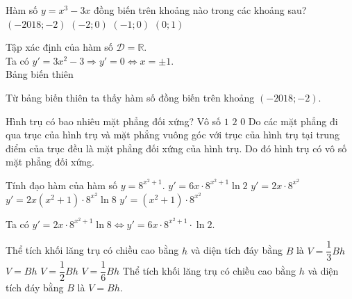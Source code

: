 \begin{ex}%
	Hàm số $y=x^3-3x$ đồng biến trên khoảng nào trong các khoảng sau?
	\choice
	{\True $(-2018;-2)$}
	{$(-2;0)$}
	{$(-1;0)$}
	{$(0;1)$}
	\loigiai
	{ Tập xác định của hàm số $ \mathscr{D} =\mathbb{R}.$\\
		Ta có $y'=3x^2-3 \Rightarrow y'=0 \Leftrightarrow x= \pm 1$.\\
		Bảng biến thiên
		\begin{center}
		\end{center}
	Từ bảng biến thiên ta thấy hàm số đồng biến trên khoảng $(-2018;-2)$.
	}
\end{ex}

\begin{ex}%
	Hình trụ có bao nhiêu mặt phẳng đối xứng?
	\choice
	{\True Vô số}
	{$1$}
	{$2$}
	{$0$}
	\loigiai
	{ Do các mặt phẳng đi qua trục của hình trụ và mặt phẳng vuông góc với trục của hình trụ tại trung điểm của trục đều là mặt phẳng đối xứng của hình trụ. Do đó hình trụ có vô số mặt phẳng đối xứng.
	}
\end{ex}

\begin{ex}%
	Tính đạo hàm của hàm số $y=8^{x^2+1}.$
	\choice
	{\True $ y'= 6x\cdot 8^{x^2+1} \ln 2$}
	{$y'= 2x \cdot 8^{x^2}$}
	{$ y'= 2x(x^2+1)\cdot 8^{x^2} \ln8$}
	{$ y'= {(x^2+1)}\cdot 8^{x^2}$}
	\loigiai
	{ Ta có $y'= 2x\cdot 8^{x^2+1} \ln 8 \Leftrightarrow y'= 6x\cdot 8^{x^2+1} \cdot \ln 2$.
		
	}
\end{ex}

\begin{ex}%
	Thể tích khối lăng trụ có chiều cao bằng $h$ và diện tích đáy bằng $B$ là
	\choice
	{$V=\dfrac{1}{3}Bh$}
	{\True $V=Bh$}
	{$V=\dfrac{1}{2}Bh$}
	{$V=\dfrac{1}{6}Bh$}
	\loigiai
	{Thể tích khối lăng trụ có chiều cao bằng $h$ và diện tích đáy bằng $B$ là  $V=Bh$.
	}
\end{ex}

